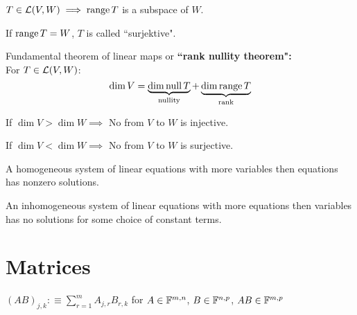 \setcounter{thm}{17}
\begin{thm}
    $T\in {\mathcal{L}(V,W)} \implies \operatorname{range} T$ is a subspace of $W$.
\end{thm}

\setcounter{thm}{18}
\begin{thm}
    If $\operatorname{range} T=W$, $T$ is called ``surjektive".
\end{thm} 

\setcounter{thm}{20}
\begin{thm}
    Fundamental theorem of linear maps or \textbf{``rank nullity theorem":} \\
    For $T \in {\mathcal{L}(V,W)}$:
    \begin{equation}
    	\dim V = 
    	\underbrace{ \dim \operatorname{null} T }_{\text{nullity}}
    	+ \underbrace{\dim \operatorname{range} T}_{\text{rank}}
    \end{equation}
\end{thm}

\setcounter{thm}{21}
\begin{thm}
    If $\dim V > \dim W \implies$ No \lm from $V$ to $W$ is injective. 
\end{thm}

\setcounter{thm}{23}
\begin{thm}
    If $\dim V < \dim W \implies$ No \lm from $V$ to $W$ is surjective.
\end{thm}

\setcounter{thm}{25}
\begin{thm}
    A homogeneous system of linear equations with more variables then equations has nonzero solutions.
\end{thm}

\setcounter{thm}{27}
\begin{thm}
	An inhomogeneous system of linear equations with more equations then variables has no solutions for some choice of constant terms.
\end{thm}

\section{Matrices}
\setcounter{thm}{40}

\begin{mydef}
    $(AB)_{j,k} :\equiv \sum_{r=1}^{m} A_{j,r} B_{r,k}$ for $A\in {\mathbb{F}}^{m,n}$, $B\in {\mathbb{F}}^{n,p}$, $AB \in {\mathbb{F}}^{m,p}$
\end{mydef}

